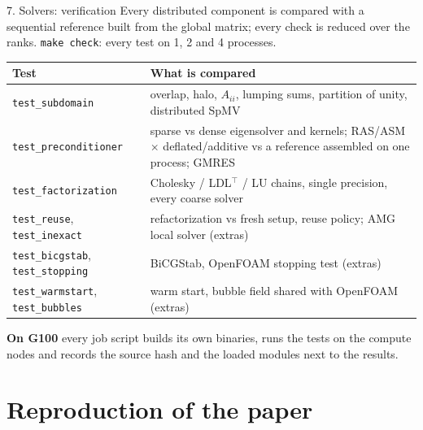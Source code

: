 \documentclass[aspectratio=169,10pt]{beamer}
\newcommand{\code}[1]{\texttt{#1}}
\newcommand{\muted}[1]{{\color{ink2}#1}}
\begin{document}
\begin{frame}{7. Solvers: verification}
  \small
  Every distributed component is compared with a \alert{sequential reference} built from the global matrix;
  every check is reduced over the ranks. \code{make check}: every test on 1, 2 and 4 processes.
  \vspace{1mm}
  \begin{center}
  \footnotesize
  \begin{tabular}{@{}l>{\raggedright\arraybackslash}p{}@{}}
    \toprule
    Test & What is compared\\
    \midrule
    \code{test\_subdomain} & overlap, halo, $A_{ii}$, lumping sums, partition of unity, distributed SpMV\\
    \code{test\_preconditioner} & sparse vs dense eigensolver and kernels; RAS/ASM $\times$ deflated/additive vs a
                                  reference assembled on one process; GMRES\\
    \code{test\_factorization} & Cholesky / LDL$^\top$ / LU chains, single precision, every coarse solver\\
    \code{test\_reuse}, \code{test\_inexact} & refactorization vs fresh setup, reuse policy; AMG local solver \muted{(extras)}\\
    \code{test\_bicgstab}, \code{test\_stopping} & BiCGStab, OpenFOAM stopping test \muted{(extras)}\\
    \code{test\_warmstart}, \code{test\_bubbles} & warm start, bubble field shared with OpenFOAM \muted{(extras)}\\
    \bottomrule
  \end{tabular}
  \end{center}
  
  \vspace{2mm}
  \textbf{\color{schwarz}On G100} every job script builds its own binaries, runs the tests on the compute nodes and records
          the source hash and the loaded modules next to the results.
  
\end{frame}

\section{Reproduction of the paper}
\end{document}
